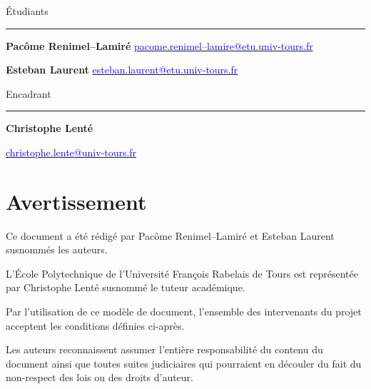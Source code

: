 \documentclass[12pt]{scrreprt} %
\begin{document}
\begin{titlepage}
    \begin{minipage}[t]{0.5\textwidth}
        \begin{flushleft}
            Étudiants
            \vspace{0.1cm}
            \hrule %
            \vspace{0.5cm}

            \textbf{Pacôme Renimel--Lamiré}
            \href{mailto:pacome.renimel--lamire@etu.univ-tours.fr}{\textcolor{blue}{pacome.renimel--lamire@etu.univ-tours.fr}}

            \textbf{Esteban Laurent}
            \href{mailto:esteban.laurent@etu.univ-tours.fr}{\textcolor{blue}{esteban.laurent@etu.univ-tours.fr}}
        \end{flushleft}
    \end{minipage}
    \begin{minipage}[t]{0.5\textwidth}
        \begin{flushright}
            Encadrant

            \vspace{0.1cm}
            \hrule %
            \vspace{0.5cm}

            \textbf{Christophe Lenté}

            \href{mailto:christophe.lente@univ-tours.fr}{\textcolor{blue}{christophe.lente@univ-tours.fr}}

        \end{flushright}
    \end{minipage}
\end{titlepage}
\restoregeometry


\chapter*{Avertissement}

Ce document a été rédigé par Pacôme Renimel--Lamiré et Esteban Laurent susnommés les auteurs.

L’École Polytechnique de l’Université François Rabelais de Tours est représentée par Christophe Lenté susnommé le tuteur académique.

Par l’utilisation de ce modèle de document, l’ensemble des intervenants du projet acceptent les conditions définies ci-après.


Les auteurs reconnaissent assumer l’entière responsabilité du contenu du document ainsi que toutes suites judiciaires qui pourraient en découler du fait du non-respect des lois ou des droits d’auteur.
\end{document}
